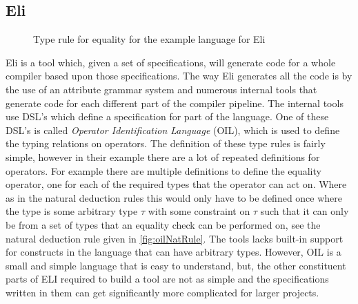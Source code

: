 \subsection{Eli}
\begin{figure}[]
    \centering
    \begin{prooftree}
    \end{prooftree}
    \caption{Type rule for equality for the example language for Eli}
    \label{fig:oilNatRule}
\end{figure}
Eli is a tool which, given a set of specifications, will generate code for a whole compiler based upon those specifications\cite{Gray:1992:ECF:129630.129637}.
The way Eli generates all the code is by the use of an attribute grammar system and numerous internal tools that generate code for each different part of the compiler pipeline.
The internal tools use DSL's which define a specification for part of the language.
One of these DSL's is called \textit{Operator Identification Language} (OIL), which is used to define the typing relations on operators.
The definition of these type rules is fairly simple, however in their example there are a lot of repeated definitions for operators.
For example there are multiple definitions to define the equality operator, one for each of the required types that the operator can act on.
Where as in the natural deduction rules this would only have to be defined once where the type is some arbitrary type $\tau$  with some constraint on $\tau$ such that it can only be from a set of types that an equality check can be performed on, see the natural deduction rule given in \autoref{fig:oilNatRule}.
The tools lacks built-in support for constructs in the language that can have arbitrary types.
However, OIL is a small and simple language that is easy to understand, but, the other constituent parts of ELI required to build a tool are not as simple and the specifications written in them can get significantly more complicated for larger projects.

